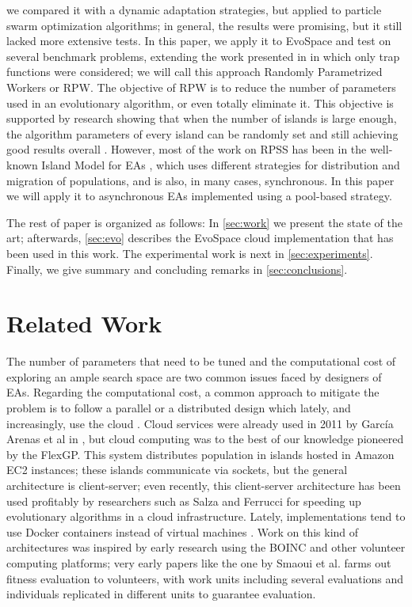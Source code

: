 \documentclass[conference]{IEEEtran}
\begin{document}
\cite{hernandez2017randomized} we compared it with a dynamic
adaptation strategies, but applied to particle swarm optimization
algorithms; in general, the results were promising, but it still lacked more extensive tests.
In this paper, we apply it to EvoSpace and test on
several benchmark problems, extending the work presented in \cite{LNCS86720702}
in which only trap functions were considered; we will call this
approach Randomly Parametrized Workers or RPW. The objective of RPW is
to reduce the number of parameters used in an evolutionary algorithm,
or even totally eliminate it. This objective is supported by research
showing that when the number of islands 
is large enough, the algorithm parameters of every island can be randomly
set and still achieving good results overall \cite{fuku2}. 
However, most of the work on 
RPSS has been in the well-known Island Model for EAs
\cite{ALBA2001451}, which uses different strategies for distribution
and migration of populations, and is also, in many cases, synchronous.
In this paper we will apply 
it to asynchronous EAs implemented using a pool-based strategy.

The rest of paper is organized as follows: In \autoref{sec:work} we
present the state of the art; afterwards, \autoref{sec:evo} describes the
EvoSpace cloud implementation that has been used in this work. The
experimental work is next in 
\autoref{sec:experiments}. Finally, we give summary and concluding remarks in
\autoref{sec:conclusions}.

\section{Related Work}
\label{sec:work}

The number of parameters that need to be tuned and the computational
cost of exploring an ample search space are two common issues faced by
designers of EAs. Regarding the computational cost, a common approach
to mitigate the problem is to follow a parallel or a distributed
design \cite{cantu-paz:migration-policies,duda2013gpu} which lately,
and increasingly, use the cloud \cite{10.1007/978-3-319-45823-6_8}. Cloud services were already
used in 2011 by Garc\'ia Arenas et al in
\cite{DBLP:conf/gecco/ArenasGCLRM11}, but cloud computing was to the
best of our knowledge pioneered by  the FlexGP. This system
distributes population in islands hosted in Amazon EC2 instances;
these islands communicate via sockets, but the general architecture
is client-server; even recently, this client-server architecture has been
used profitably by researchers such as Salza and Ferrucci
\cite{SALZA2019276} for speeding up evolutionary algorithms in a cloud
infrastructure. Lately, implementations tend to use Docker containers
instead of virtual machines \cite{Dziurzanski2020}. Work on this kind
of architectures was inspired by early research using the BOINC and
other volunteer computing platforms; very early papers like the one by
Smaoui et al. \cite{FekiNG09} farms out fitness evaluation to
volunteers, with work units including several evaluations and
individuals replicated in different units to guarantee evaluation.
\end{document}
